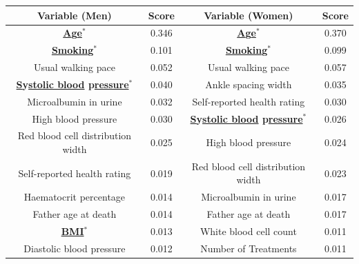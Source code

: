 \documentclass [PhD] {uclathes}
\begin{document}
\begin{table}[t]
\centering
\begin{tabular}{|c|c|c|c|}
\hline
{\bf \footnotesize Variable (Men)} & {\bf \footnotesize Score} & {\bf \footnotesize Variable (Women)} & {\bf \footnotesize Score} \\ \hline
{\footnotesize {\bf \underline{A}g\underline{e}$^{*}$}} & {\footnotesize 0.346} & {\footnotesize {\bf \underline{A}g\underline{e}$^{*}$}} & {\footnotesize 0.370}   \\ \hline
{\footnotesize {\bf \underline{Smokin}g$^{*}$}} & {\footnotesize 0.101} & {\footnotesize {\bf \underline{Smokin}g$^{*}$}} & {\footnotesize 0.099}  \\ \hline
{\footnotesize Usual walking pace} & {\footnotesize 0.052} & {\footnotesize Usual walking pace} & {\footnotesize 0.057}  \\ \hline
{\footnotesize {\bf \underline{S}y\underline{stolic blood} p\underline{ressure}$^{*}$}} & {\footnotesize 0.040}  & {\footnotesize Ankle spacing width} & {\footnotesize 0.035} \\ \hline
{\footnotesize Microalbumin in urine} & {\footnotesize 0.032} & {\footnotesize Self-reported health rating} & {\footnotesize 0.030}  \\ \hline
{\footnotesize High blood pressure} & {\footnotesize 0.030} & {\footnotesize {\bf \underline{S}y\underline{stolic blood} p\underline{ressure}$^{*}$}} & {\footnotesize 0.026}  \\ \hline
{\footnotesize Red blood cell distribution width} & {\footnotesize 0.025} & {\footnotesize High blood pressure} & {\footnotesize 0.024} \\ \hline
{\footnotesize Self-reported health rating} & {\footnotesize 0.019}  & {\footnotesize Red blood cell distribution width} & {\footnotesize 0.023} \\ \hline
{\footnotesize Haematocrit percentage} & {\footnotesize 0.014} & {\footnotesize Microalbumin in urine} & {\footnotesize 0.017}  \\ \hline
{\footnotesize Father age at death} & {\footnotesize 0.014} & {\footnotesize Father age at death} & {\footnotesize 0.017} \\ \hline
{\footnotesize {\bf \underline{BMI}$^{*}$}} & {\footnotesize 0.013} & {\footnotesize White blood cell count} & {\footnotesize 0.011} \\ \hline
{\footnotesize Diastolic blood pressure} & {\footnotesize 0.012} & {\footnotesize Number of Treatments} & {\footnotesize 0.011} \\ \hline

\end{tabular}
\end{table}
\end{document}

